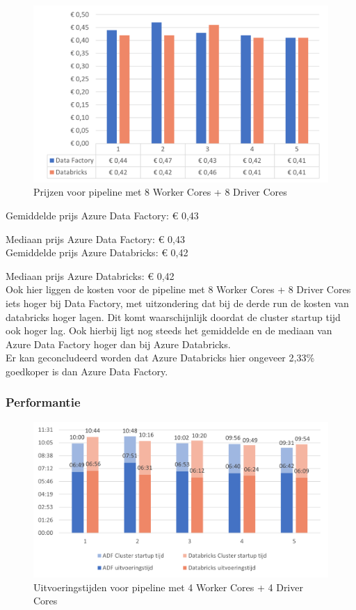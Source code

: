 \begin{figure}[H]
    \centering
    \includegraphics[width=1\textwidth]{./graphics/kosten/graf2_update.png}
    \caption{Prijzen voor pipeline met 8 Worker Cores + 8 Driver Cores}
\end{figure}

Gemiddelde prijs Azure Data Factory: € 0,43

Mediaan prijs Azure Data Factory: € 0,43\\

Gemiddelde prijs Azure Databricks: € 0,42

Mediaan prijs Azure Databricks: € 0,42\\

Ook hier liggen de kosten voor de pipeline met 8 Worker Cores + 8 Driver Cores iets hoger bij Data Factory, met uitzondering dat bij de derde run de kosten van databricks hoger lagen. Dit komt waarschijnlijk doordat de cluster startup tijd ook hoger lag. Ook hierbij ligt nog steeds het gemiddelde en de mediaan van Azure Data Factory hoger dan bij Azure Databricks.\\

Er kan geconcludeerd worden dat Azure Databricks hier ongeveer 2,33\% goedkoper is dan Azure Data Factory.

\subsubsection{Performantie}

\begin{figure}[H]
    \centering
    \includegraphics[width=1\textwidth]{./graphics/kosten/graf3_update.png}
    \caption{Uitvoeringstijden voor pipeline met 4 Worker Cores + 4 Driver Cores}
\end{figure}

